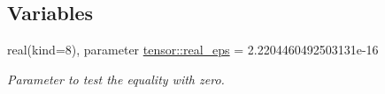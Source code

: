 \subsection*{Variables}
\begin{DoxyCompactItemize}
\item 
real(kind=8), parameter \hyperlink{namespacetensor_a2a2ab182d86107e62533c3f0043652cc}{tensor\+::real\+\_\+eps} = 2.\+2204460492503131e-\/16
\begin{DoxyCompactList}\small\item\em Parameter to test the equality with zero. \end{DoxyCompactList}\end{DoxyCompactItemize}
